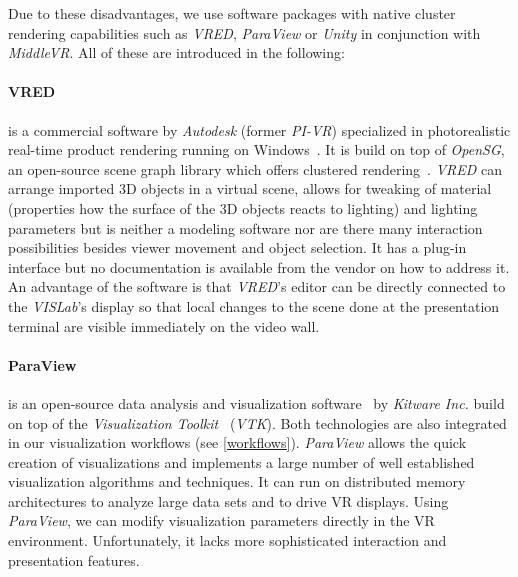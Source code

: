 \documentclass[twocolumn]{svjour3}          %
\begin{document}
Due to these disadvantages, we use software packages with native cluster rendering capabilities such as \emph{VRED}, \emph{ParaView} or \emph{Unity} in conjunction with \emph{MiddleVR}. All of these are introduced in the following:

\paragraph{VRED}
is a commercial software by \emph{Autodesk} (former \emph{PI-VR}) specialized in photorealistic real-time product rendering running on Windows~\cite{web:vred}. It is build on top of \emph{OpenSG}, an open-source scene graph library which offers clustered rendering~\cite{opensg}. \emph{VRED} can arrange imported 3D objects in a virtual scene, allows for tweaking of material (properties how the surface of the 3D objects reacts to lighting) and lighting parameters but is neither a modeling software nor are there many interaction possibilities besides viewer movement and object selection. It has a plug-in interface but no documentation is available from the vendor on how to address it. An advantage of the software is that \emph{VRED}'s editor can be directly connected to the \emph{VISLab}'s display so that local changes to the scene done at the presentation terminal are visible immediately on the video wall.

\paragraph{ParaView}
is an open-source data analysis and visualization software~\cite{paraview} by \emph{Kitware Inc.} build on top of the \emph{Visualization Toolkit}~\cite{vtk} (\emph{VTK}). Both technologies are also integrated in our visualization workflows (see \ref{workflows}). \emph{ParaView} allows the quick creation of visualizations and implements a large number of well established visualization algorithms and techniques. It can run on distributed memory architectures to analyze large data sets and to drive VR displays. Using \emph{ParaView}, we can modify visualization parameters directly in the VR environment. Unfortunately, it lacks more sophisticated interaction and presentation features.
\end{document}
